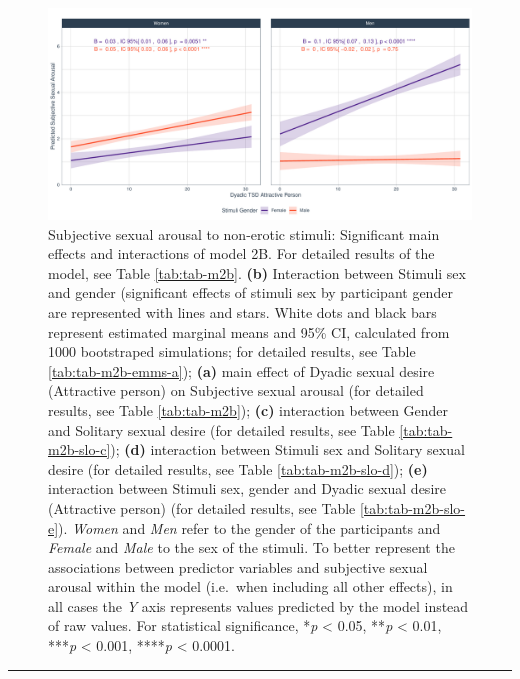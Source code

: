 \documentclass[
  bookmarksnumbered]{article}
\begin{document}
\begin{figure}
\centering
\includegraphics{Sexual_Desire_Arousal_files/figure-latex/fig-h2b-1.pdf}
\caption{\label{fig:fig-h2b}Subjective sexual arousal to non-erotic stimuli: Significant main effects and interactions of model 2B. For detailed results of the model, see Table \ref{tab:tab-m2b}. \textbf{(b)} Interaction between Stimuli sex and gender (significant effects of stimuli sex by participant gender are represented with lines and stars. White dots and black bars represent estimated marginal means and 95\% CI, calculated from 1000 bootstraped simulations; for detailed results, see Table \ref{tab:tab-m2b-emms-a}); \textbf{(a)} main effect of Dyadic sexual desire (Attractive person) on Subjective sexual arousal (for detailed results, see Table \ref{tab:tab-m2b}); \textbf{(c)} interaction between Gender and Solitary sexual desire (for detailed results, see Table \ref{tab:tab-m2b-slo-c}); \textbf{(d)} interaction between Stimuli sex and Solitary sexual desire (for detailed results, see Table \ref{tab:tab-m2b-slo-d}); \textbf{(e)} interaction between Stimuli sex, gender and Dyadic sexual desire (Attractive person) (for detailed results, see Table \ref{tab:tab-m2b-slo-e}). \emph{Women} and \emph{Men} refer to the gender of the participants and \emph{Female} and \emph{Male} to the sex of the stimuli. To better represent the associations between predictor variables and subjective sexual arousal within the model (i.e.~when including all other effects), in all cases the \emph{Y} axis represents values predicted by the model instead of raw values. For statistical significance, *\emph{p} \textless{} 0.05, **\emph{p} \textless{} 0.01, ***\emph{p} \textless{} 0.001, ****\emph{p} \textless{} 0.0001.}
\end{figure}

\begin{center}\rule{0.5\linewidth}{0.5pt}\end{center}
\end{document}
